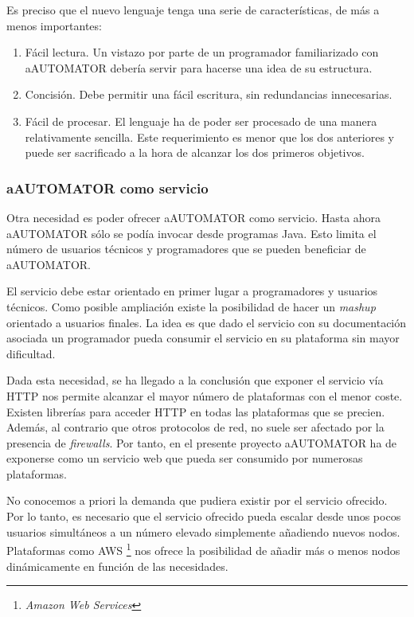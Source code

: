 Es preciso que el nuevo lenguaje tenga una serie de características, de
más a menos importantes:

\begin{enumerate}
  \item Fácil lectura. Un vistazo por parte de un programador
    familiarizado con aAUTOMATOR debería servir para hacerse una idea
    de su estructura.
  \item Concisión. Debe permitir una fácil escritura, sin redundancias
    innecesarias.
  \item Fácil de procesar. El lenguaje ha de poder ser procesado de
    una manera relativamente sencilla. Este requerimiento es menor que
    los dos anteriores y puede ser sacrificado a la hora de alcanzar
    los dos primeros objetivos.
\end{enumerate}

\subsubsection{aAUTOMATOR como servicio}

Otra necesidad es poder ofrecer aAUTOMATOR como servicio. Hasta ahora
aAUTOMATOR sólo se podía invocar desde programas Java. Esto limita el
número de usuarios técnicos y programadores que se pueden beneficiar
de aAUTOMATOR.

El servicio debe estar orientado en primer lugar a programadores y
usuarios técnicos. Como posible ampliación existe la posibilidad de
hacer un \emph{mashup} orientado a usuarios finales. La idea es que
dado el servicio con su documentación asociada un programador pueda
consumir el servicio en su plataforma sin mayor dificultad.

Dada esta necesidad, se ha llegado a la conclusión que exponer el
servicio vía HTTP nos permite alcanzar el mayor número de plataformas
con el menor coste. Existen librerías para acceder HTTP en todas las
plataformas que se precien. Además, al contrario que otros protocolos
de red, no suele ser afectado por la presencia de
\emph{firewalls}. Por tanto, en el presente proyecto aAUTOMATOR ha de
exponerse como un servicio web que pueda ser consumido por numerosas
plataformas.

No conocemos a priori la demanda que pudiera existir por el servicio
ofrecido. Por lo tanto, es necesario que el servicio ofrecido pueda
escalar desde unos pocos usuarios simultáneos a un número elevado
simplemente añadiendo nuevos nodos. Plataformas como
AWS \footnote{\emph{Amazon Web Services}} nos ofrece la posibilidad de
añadir más o menos nodos dinámicamente en función de las necesidades.

